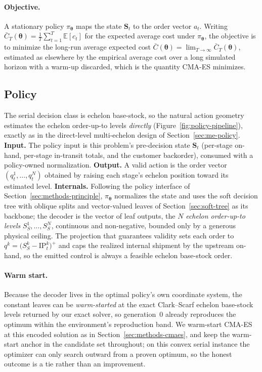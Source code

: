 \documentclass[11pt]{article}
\newcommand{\btheta}{\boldsymbol{\theta}}
\begin{document}
\paragraph{Objective.}
A stationary policy $\pi_{\btheta}$ maps the state $\mathbf S_t$ to the order vector $a_t$. Writing
$\bar C_T(\btheta)=\tfrac1T\sum_{t=1}^{T}\mathbb E[c_t]$ for the expected average cost under
$\pi_{\btheta}$, the objective is to minimize the long-run average expected cost
$\bar C(\btheta)=\lim_{T\to\infty}\bar C_T(\btheta)$, estimated as elsewhere by the empirical average
cost over a long simulated horizon with a warm-up discarded, which is the quantity CMA-ES minimizes.

\FloatBarrier

\subsection{Policy}
\label{sec:serial-policy}

The serial decision class is echelon base-stock, so the natural action geometry estimates the echelon
order-up-to levels \emph{directly} (Figure~\ref{fig:policy-pipeline}), exactly as in the
direct-level multi-echelon design of Section~\ref{sec:me-policy}. \textbf{Input.} The policy input is
this problem's pre-decision state $\mathbf S_t$ (per-stage on-hand, per-stage in-transit totals, and
the customer backorder), consumed with a policy-owned normalization. \textbf{Output.} A valid action
is the order vector $(q^1_t,\dots,q^N_t)$ obtained by raising each stage's echelon position toward its
estimated level. \textbf{Internals.} Following the policy interface of
Section~\ref{sec:methods-principle}, $\pi_{\btheta}$ normalizes the state and uses the soft decision
tree with oblique splits and vector-valued leaves of Section~\ref{sec:soft-tree} as its backbone; the
decoder is the vector of leaf outputs, the $N$ \emph{echelon order-up-to levels} $S^1_S,\dots,S^N_S$,
continuous and non-negative, bounded only by a generous physical ceiling. The projection that
guarantees validity sets each order to $q^k=\big(S^k_S-\mathrm{IP}^k_t\big)^+$ and caps the realized
internal shipment by the upstream on-hand, so the emitted control is always a feasible echelon
base-stock order.

\paragraph{Warm start.}
Because the decoder lives in the optimal policy's own coordinate system, the constant leaves can be
\emph{warm-started} at the exact Clark--Scarf echelon base-stock levels returned by our exact solver,
so generation~$0$ already reproduces the optimum within the environment's
reproduction band. We warm-start CMA-ES at this encoded solution as in
Section~\ref{sec:methods-cmaes}, and keep the warm-start anchor in the candidate set throughout; on
this convex serial instance the optimizer can only search outward from a proven optimum, so the honest
outcome is a tie rather than an improvement.
\end{document}
